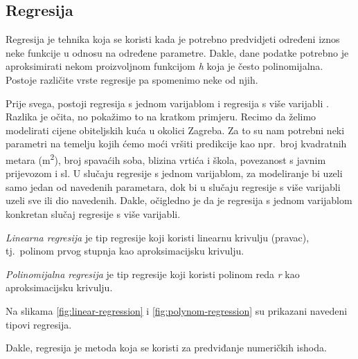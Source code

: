\documentclass[times, utf8, zavrsni]{fer}
\begin{document}
\subsection{Regresija}
Regresija  je tehnika koja se koristi kada je potrebno predvidjeti određeni iznos neke funkcije u odnosu na određene parametre. Dakle, dane podatke potrebno je aproksimirati nekom proizvoljnom funkcijom \textit{h} koja je često polinomijalna. Postoje različite vrste regresije pa spomenimo neke od njih. 

Prije svega, postoji regresija s jednom varijablom  i regresija s više varijabli . Razlika je očita, no pokažimo to na kratkom primjeru. Recimo da želimo modelirati cijene obiteljskih kuća u okolici Zagreba. Za to su nam potrebni neki parametri na temelju kojih ćemo moći vršiti predikcije kao npr.\ broj kvadratnih metara (m\textsuperscript{2}), broj spavaćih soba, blizina vrtića i škola, povezanost s javnim prijevozom i sl. U slučaju regresije s jednom varijablom, za modeliranje bi uzeli samo jedan od navedenih parametara, dok bi u slučaju regresije s više varijabli uzeli sve ili dio navedenih. Dakle, očigledno je da je regresija s jednom varijablom konkretan slučaj regresije s više varijabli.

\bigskip

\textit{Linearna regresija}  je tip regresije koji koristi linearnu krivulju (pravac), tj.\ polinom prvog stupnja kao aproksimacijsku krivulju.

\textit{Polinomijalna regresija}  je tip regresije koji koristi polinom reda \textit{r} kao aproksimacijsku krivulju.

Na slikama \ref{fig:linear-regression} i \ref{fig:polynom-regression} su prikazani navedeni tipovi regresija.

\bigskip

Dakle, regresija je metoda koja se koristi za predviđanje numeričkih ishoda.
\end{document}
